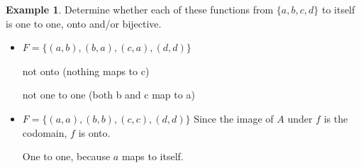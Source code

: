 \documentclass[letterpaper,10pt]{article}
\theoremstyle{plain}
\theoremstyle{definition}
\newtheorem{exmp}[thm]{Example}
\theoremstyle{remark}
\begin{document}
\begin{exmp}
Determine whether each of these functions from $\{a,b,c,d\}$ to itself is one to one, onto and/or bijective.
\begin{itemize}
\item $F=\{(a,b), (b,a), (c,a),(d,d)\}$

not onto (nothing maps to c)

not one to one (both b and c map to a)
\item $F=\{(a,a), (b,b), (c,c),(d,d)\}$
Since the image of $A$ under $f$ is the codomain, $f$ is onto.

One to one, because $a$ maps to itself.



\end{itemize}
\end{exmp}
\end{document}
